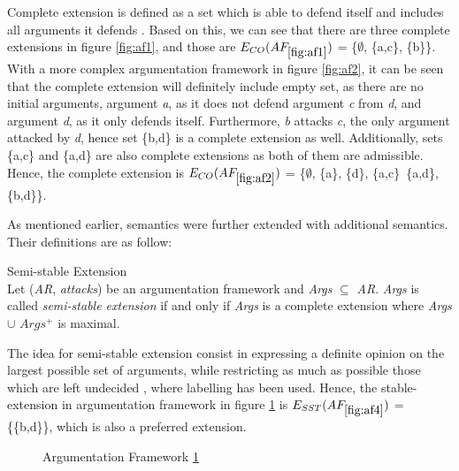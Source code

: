 Complete extension is defined as a set which is able to defend itself and includes all arguments it defends \citep{baroni2009semantics}. Based on this, we can see that there are three complete extensions in figure \ref{fig:af1}, and those are \textit{$E_{CO}(AF_{\ref{fig:af1}})$} = \{$\emptyset$, \{a,c\}, \{b\}\}. With a more complex argumentation framework in figure \ref{fig:af2}, it can be seen that the complete extension will definitely include empty set, as there are no initial arguments, argument \textit{a}, as it does not defend argument \textit{c} from \textit{d}, and argument \textit{d}, as it only defends itself. Furthermore, \textit{b} attacks \textit{c}, the only argument attacked by \textit{d}, hence set \{b,d\} is a complete extension as well. Additionally, sets \{a,c\} and \{a,d\} are also complete extensions as both of them are admissible. Hence, the complete extension is \textit{$E_{CO}(AF_{\ref{fig:af2}})$} = \{$\emptyset$, \{a\}, \{d\}, \{a,c\}\, \{a,d\}, \{b,d\}\}.

As mentioned earlier, \citet{dung1995} semantics were further extended with additional semantics. Their definitions are as follow: 

\begin{definition}{Semi-stable Extension}
\label{def:semiStableExtension}\\
Let (\textit{AR}, \textit{attacks}) be an argumentation framework and \textit{Args} $\subseteq$ \textit{AR}. \textit{Args} is called \textit{semi-stable extension} if and only if \textit{Args} is a complete extension where \textit{Args} $\cup$ \textit{$Args^+$} is maximal.
\end{definition}

The idea for semi-stable extension consist in expressing a definite opinion on the largest possible set of arguments, while restricting as much as possible those which are left undecided \citep{baroni2011introduction}, where labelling has been used. Hence, the stable-extension in argumentation framework in figure \ref{fig:af4} is \textit{$E_{SST}(AF_{\ref{fig:af4}})$} = \{\{b,d\}\}, which is also a preferred extension.

\begin{figure}[h]
\centering
{}
\caption{Argumentation Framework \ref{fig:af4}}
\label{fig:af4}
\end{figure}

